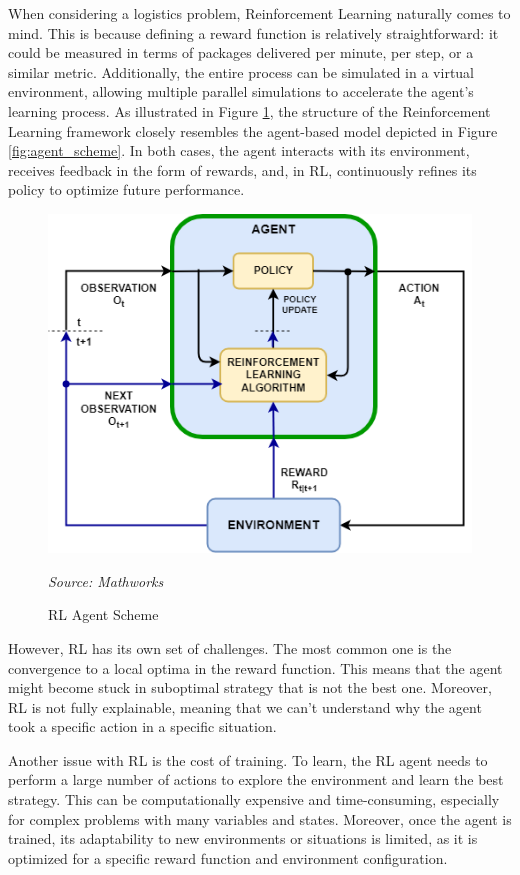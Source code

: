 When considering a logistics problem, Reinforcement Learning naturally comes to mind.
This is because defining a reward function is relatively straightforward: it could
be measured in terms of packages delivered per minute, per step, or a similar metric.
Additionally, the entire process can be simulated in a virtual environment,
allowing multiple parallel simulations to accelerate the agent's learning
process. As illustrated in Figure \ref{fig:rl_scheme}, the structure of the
Reinforcement Learning framework closely resembles the agent-based model
depicted in Figure \ref{fig:agent_scheme}. In both cases, the agent interacts
with its environment, receives feedback in the form of rewards, and, in RL,
continuously refines its policy to optimize future performance.

\begin{figure}[ht!]
  \centering
  \includegraphics[width=.6\textwidth]{images/background/rl_scheme.png}
  \caption{RL Agent Scheme}
  {\emph{Source: Mathworks}\footnotemark} \label{fig:rl_scheme}
\end{figure}

However, RL has its own set of challenges. The most common one is the convergence
to a local optima in the reward function. This means that the agent might become
stuck in suboptimal strategy that is not the best one. Moreover, RL is not fully
explainable, meaning that we can't understand why the agent took a specific action
in a specific situation.

Another issue with RL is the cost of training. To learn, the RL agent needs to perform
a large number of actions to explore the environment and learn the best strategy.
This can be computationally expensive and time-consuming, especially for complex
problems with many variables and states. Moreover, once the agent is trained,
its adaptability to new environments or situations is limited, as it is optimized
for a specific reward function and environment configuration.

